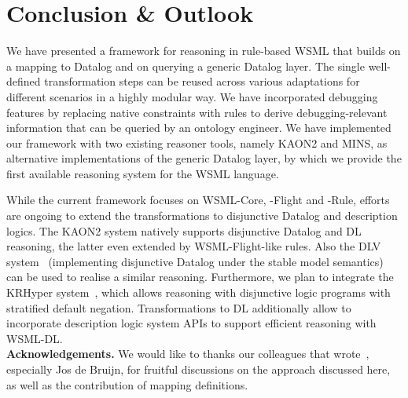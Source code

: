 \section{Conclusion \& Outlook\label{sec:outlook}}
We have presented a framework for reasoning in rule-based WSML
that builds on a mapping to Datalog and on querying a generic
Datalog layer. The single well-defined transformation steps can be
reused across various adaptations for different scenarios in a
highly modular way. We have incorporated debugging features by
replacing native constraints with rules to derive
debugging-relevant information that can be queried by an ontology
engineer. We have implemented our framework with two existing
reasoner tools, namely KAON2 and MINS, as alternative
implementations of the generic Datalog layer, by which we provide
the first available reasoning system for the WSML language.

While the current framework focuses on WSML-Core, -Flight and -Rule,
efforts are ongoing to extend the transformations to disjunctive
Datalog and description logics. The KAON2 system natively supports
disjunctive Datalog and DL reasoning, the latter even extended by
WSML-Flight-like rules. Also the DLV system~\cite{citrigno97dlv}
(implementing disjunctive Datalog under the stable model semantics)
can be used to realise a similar reasoning. Furthermore, we plan to
integrate the KRHyper system~\cite{wernhard03system}, which allows
reasoning with disjunctive logic programs with stratified default
negation. Transformations to DL additionally allow to incorporate
description logic system APIs to support efficient reasoning with
WSML-DL.\\[2mm]
{\bfseries Acknowledgements.} We would like to thanks our colleagues
that wrote~\cite{wsml-spec}, especially Jos de Bruijn, for fruitful
discussions on the approach discussed here, as well as the
contribution of mapping definitions.
